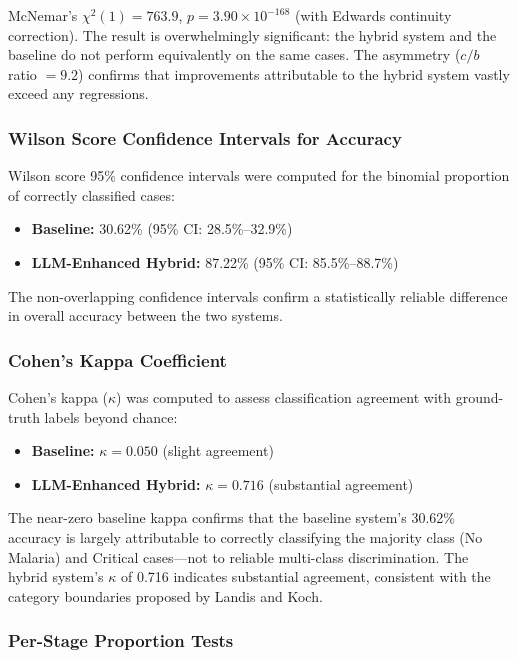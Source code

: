 \documentclass[12pt,a4paper]{article}
\begin{document}
McNemar's $\chi^2(1) = 763.9$, $p = 3.90 \times 10^{-168}$ (with Edwards continuity correction). The result is overwhelmingly significant: the hybrid system and the baseline do not perform equivalently on the same cases. The asymmetry ($c/b$ ratio $= 9.2$) confirms that improvements attributable to the hybrid system vastly exceed any regressions.

\subsubsection{Wilson Score Confidence Intervals for Accuracy}

Wilson score 95\% confidence intervals were computed for the binomial proportion of correctly classified cases:

\begin{itemize}
  \item \textbf{Baseline:} 30.62\% (95\% CI: 28.5\%--32.9\%)
  \item \textbf{LLM-Enhanced Hybrid:} 87.22\% (95\% CI: 85.5\%--88.7\%)
\end{itemize}

The non-overlapping confidence intervals confirm a statistically reliable difference in overall accuracy between the two systems.

\subsubsection{Cohen's Kappa Coefficient}

Cohen's kappa ($\kappa$) was computed to assess classification agreement with ground-truth labels beyond chance:

\begin{itemize}
  \item \textbf{Baseline:} $\kappa = 0.050$ (slight agreement)
  \item \textbf{LLM-Enhanced Hybrid:} $\kappa = 0.716$ (substantial agreement)
\end{itemize}

The near-zero baseline kappa confirms that the baseline system's 30.62\% accuracy is largely attributable to correctly classifying the majority class (No Malaria) and Critical cases---not to reliable multi-class discrimination. The hybrid system's $\kappa$ of 0.716 indicates substantial agreement, consistent with the category boundaries proposed by Landis and Koch.

\subsubsection{Per-Stage Proportion Tests}
\end{document}
